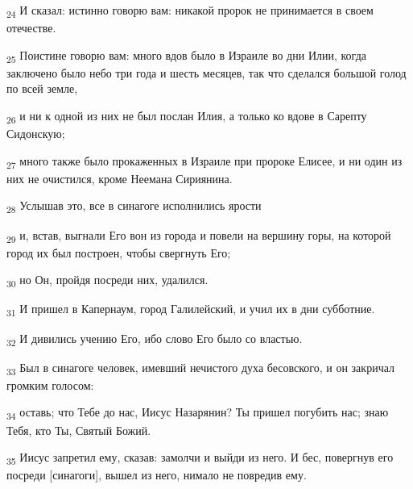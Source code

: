 \begin{tcolorbox}
\textsubscript{24} И сказал: истинно говорю вам: никакой пророк не принимается в своем отечестве.
\end{tcolorbox}
\begin{tcolorbox}
\textsubscript{25} Поистине говорю вам: много вдов было в Израиле во дни Илии, когда заключено было небо три года и шесть месяцев, так что сделался большой голод по всей земле,
\end{tcolorbox}
\begin{tcolorbox}
\textsubscript{26} и ни к одной из них не был послан Илия, а только ко вдове в Сарепту Сидонскую;
\end{tcolorbox}
\begin{tcolorbox}
\textsubscript{27} много также было прокаженных в Израиле при пророке Елисее, и ни один из них не очистился, кроме Неемана Сириянина.
\end{tcolorbox}
\begin{tcolorbox}
\textsubscript{28} Услышав это, все в синагоге исполнились ярости
\end{tcolorbox}
\begin{tcolorbox}
\textsubscript{29} и, встав, выгнали Его вон из города и повели на вершину горы, на которой город их был построен, чтобы свергнуть Его;
\end{tcolorbox}
\begin{tcolorbox}
\textsubscript{30} но Он, пройдя посреди них, удалился.
\end{tcolorbox}
\begin{tcolorbox}
\textsubscript{31} И пришел в Капернаум, город Галилейский, и учил их в дни субботние.
\end{tcolorbox}
\begin{tcolorbox}
\textsubscript{32} И дивились учению Его, ибо слово Его было со властью.
\end{tcolorbox}
\begin{tcolorbox}
\textsubscript{33} Был в синагоге человек, имевший нечистого духа бесовского, и он закричал громким голосом:
\end{tcolorbox}
\begin{tcolorbox}
\textsubscript{34} оставь; что Тебе до нас, Иисус Назарянин? Ты пришел погубить нас; знаю Тебя, кто Ты, Святый Божий.
\end{tcolorbox}
\begin{tcolorbox}
\textsubscript{35} Иисус запретил ему, сказав: замолчи и выйди из него. И бес, повергнув его посреди [синагоги], вышел из него, нимало не повредив ему.
\end{tcolorbox}

